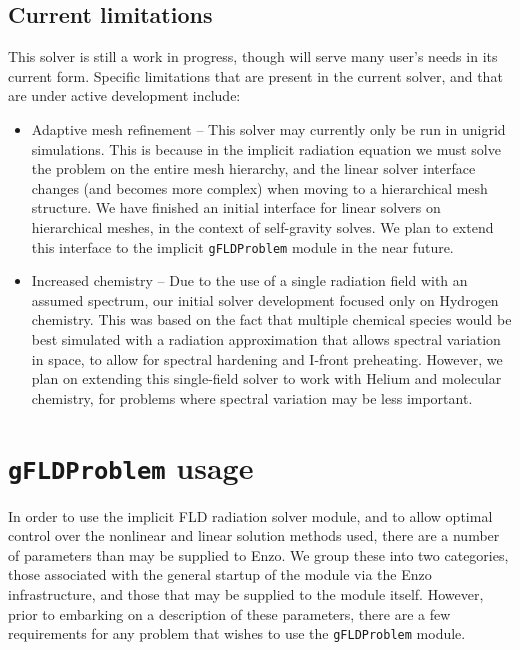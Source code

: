 \documentclass[letterpaper,10pt]{article}
\renewcommand{\(}{\left(}
\renewcommand{\)}{\right)}
\begin{document}
\subsection{Current limitations}
\label{sec:limitations}

This solver is still a work in progress, though will serve many user's
needs in its current form.  Specific limitations that are present in
the current solver, and that are under active development include:
\begin{itemize}
\item Adaptive mesh refinement -- This solver may currently only be
  run in unigrid simulations.  This is because in the implicit
  radiation equation we must solve the problem on the entire mesh
  hierarchy, and the linear solver interface changes (and becomes more
  complex) when moving to a hierarchical mesh structure.  We have
  finished an initial interface for linear solvers on hierarchical
  meshes, in the context of self-gravity solves.  We plan to extend
  this interface to the implicit {\tt gFLDProblem} module in the near
  future.
\item Increased chemistry -- Due to the use of a single radiation
  field with an assumed spectrum, our initial solver development
  focused only on Hydrogen chemistry.  This was based on the fact that
  multiple chemical species would be best simulated with a radiation
  approximation that allows spectral variation in space, to allow for
  spectral hardening and I-front preheating.  However, we plan on
  extending this single-field solver to work with Helium and molecular
  chemistry, for problems where spectral variation may be less
  important.
\end{itemize}




\section{{\tt gFLDProblem} usage}
\label{sec:module_usage}

In order to use the implicit FLD radiation solver module, and to
allow optimal control over the nonlinear and linear solution methods
used, there are a number of parameters than may be supplied to Enzo.
We group these into two categories, those associated with the general
startup of the module via the Enzo infrastructure, and those that may
be supplied to the module itself.  However, prior to embarking on a
description of these parameters, there are a few requirements for any
problem that wishes to use the {\tt gFLDProblem} module.
\end{document}
